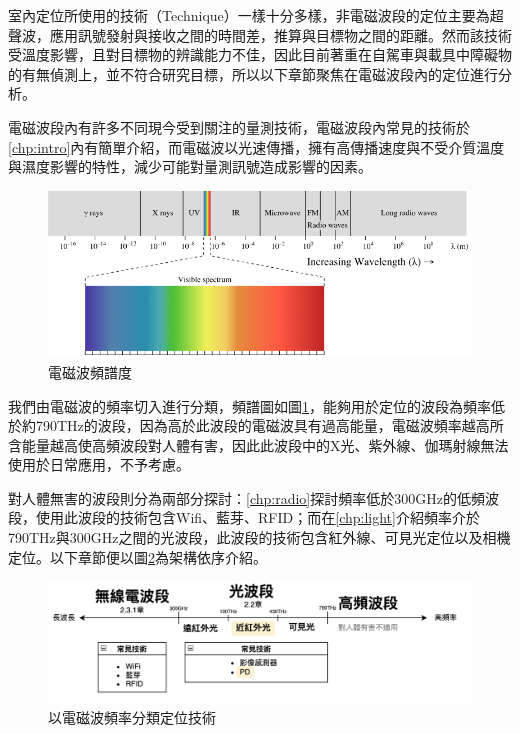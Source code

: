     室內定位所使用的技術（Technique）一樣十分多樣，非電磁波段的定位主要為超聲波，應用訊號發射與接收之間的時間差，推算與目標物之間的距離。然而該技術受溫度影響，且對目標物的辨識能力不佳，因此目前著重在自駕車與載具中障礙物的有無偵測上\cite{survey_ultrasonic}，並不符合研究目標，所以以下章節聚焦在電磁波段內的定位進行分析。

    電磁波段內有許多不同現今受到關注的量測技術，電磁波段內常見的技術於\ref{chp:intro}內有簡單介紹，而電磁波以光速傳播，擁有高傳播速度與不受介質溫度與濕度影響的特性，減少可能對量測訊號造成影響的因素。

    \begin{figure}[h]
        \centering
        \includegraphics[width=12cm]{ch2pic/electro_spectrum.png}
        \caption{電磁波頻譜度\cite{Spectrum}}
        \label{pic:spectrum}
    \end{figure}

    我們由電磁波的頻率切入進行分類，頻譜圖如圖\ref{pic:spectrum}，能夠用於定位的波段為頻率低於約790THz的波段，因為高於此波段的電磁波具有過高能量，電磁波頻率越高所含能量越高使高頻波段對人體有害，因此此波段中的X光、紫外線、伽瑪射線無法使用於日常應用，不予考慮。

    對人體無害的波段則分為兩部分探討：\ref{chp:radio}探討頻率低於300GHz的低頻波段\cite{book_electromagnetic}，使用此波段的技術包含Wifi、藍芽、RFID；而在\ref{chp:light}介紹頻率介於790THz與300GHz之間的光波段，此波段的技術包含紅外線、可見光定位以及相機定位。以下章節便以圖\ref{pic:electro_sort}為架構依序介紹。


    \begin{figure}[h]
        \centering
        \includegraphics[width=13cm]{ch2pic/electro_sort.png}
        \caption{以電磁波頻率分類定位技術}
        \label{pic:electro_sort}
    \end{figure}

